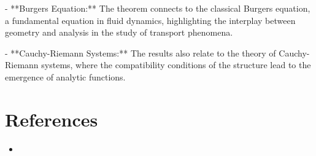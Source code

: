 \documentclass[11pt,a4paper]{article}
\begin{document}
- **Burgers Equation:** The theorem connects to the classical Burgers equation, a fundamental equation in fluid dynamics, highlighting the interplay between geometry and analysis in the study of transport phenomena.

- **Cauchy-Riemann Systems:** The results also relate to the theory of Cauchy-Riemann systems, where the compatibility conditions of the structure lead to the emergence of analytic functions.

\section{References}
\begin{itemize}
    \item \cite{2601.19274v4}
\end{itemize}
\end{document}
